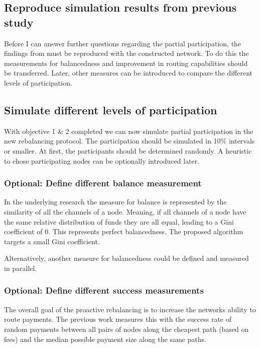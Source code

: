 \documentclass[final]{fhnwreport}       %
\begin{document}
\subsection{Reproduce simulation results from previous study}\label{sec:o_repro}
Before I can answer further questions regarding the partial participation, the findings from \cite{pickhardt_imbalance_2019} must be reproduced with the constructed network. To do this the measurements for balancedness and improvement in routing capabilities should be transferred. Later, other measures can be introduced to compare the different levels of participation.

\subsection{Simulate different levels of participation}\label{sec:o_sim}
With objective 1 \& 2 completed we can now simulate partial participation in the new rebalancing protocol. The participation should be simulated in 10\% intervals or smaller. At first, the participants should be determined randomly. A heuristic to chose participating nodes can be optionally introduced later.

\subsubsection{Optional: Define different balance measurement}
In the underlying research \cite{pickhardt_imbalance_2019} the measure for balance is represented by the similarity of all the channels of a node. Meaning, if all channels of a node have the same relative distribution of funds they are all equal, leading to a Gini coefficient of $0$. This represents perfect balancedness. The proposed algorithm targets a small Gini coefficient.

Alternatively, another measure for balancedness could be defined and measured in parallel. 

\subsubsection{Optional: Define different success measurements}
The overall goal of the proactive rebalancing is to increase the networks ability to route payments. The previous work \cite{pickhardt_imbalance_2019} measures this with the success rate of random payments between all pairs of nodes along the cheapest path (based on fees) and the median possible payment size along the same paths. 
\end{document}
